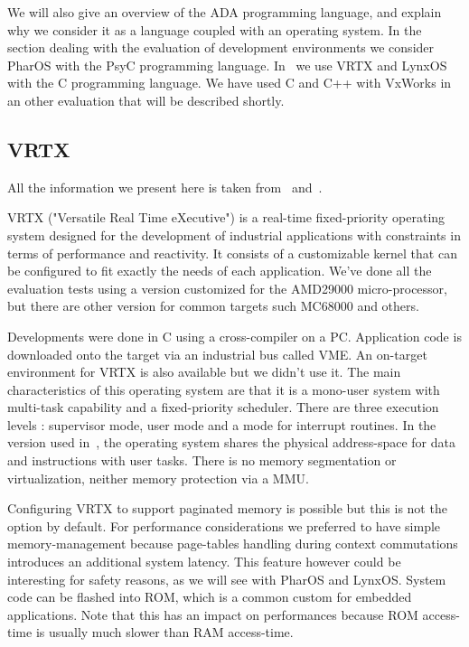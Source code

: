 \documentclass[10pt]{report}
\begin{document}
We will also give an overview of the ADA programming language,
and explain why we consider it as a language coupled with an
operating system. In the section dealing with the evaluation of development
environments we consider PharOS with the PsyC programming language. 
In~\cite{Delchini:95} we use VRTX and LynxOS with the C programming language. 
We have used C and C++ with VxWorks in an other evaluation that will be described shortly.

\subsection{VRTX}

All the information we present here is taken from~\cite{VRTX:90} and~\cite{AMD29000:91}.

VRTX ("Versatile Real Time eXecutive") is a real-time fixed-priority 
operating system designed for the development of industrial applications
with constraints in terms of performance and reactivity. 
It consists of a customizable kernel that can be
configured to fit exactly the needs of each application. We've done all
the evaluation tests using a version customized for the AMD29000
micro-processor, but there are other version for common targets
such MC68000 and others.

Developments were done in C using a cross-compiler on a PC.
Application code is downloaded onto the target via an industrial
bus called VME. An on-target environment for VRTX is also
available but we didn't use it. The main characteristics of this
operating system are that it is a mono-user system with multi-task
capability and a fixed-priority scheduler. There are three
execution levels : supervisor mode, user mode and a mode for
interrupt routines. In the version used in~\cite{Delchini:95}, the
operating system shares the physical address-space for data and
instructions with user tasks. There is no memory segmentation or virtualization, 
neither memory protection via a MMU.

Configuring VRTX to support paginated memory is possible but this
is not the option by default. For performance considerations we
preferred to have simple memory-management because page-tables
handling during context commutations introduces an additional
system latency. This feature however could be interesting for
safety reasons, as we will see with PharOS and LynxOS. System code
can be flashed into ROM, which is a common custom for embedded
applications. Note that this has an impact on performances
because ROM access-time is usually much slower than RAM access-time.
\end{document}
